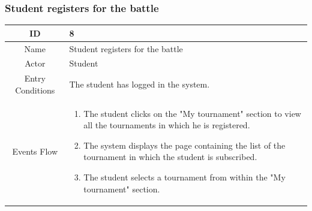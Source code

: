 \subsubsection{Student registers for the battle}
\begin{longtable}{|c| p{10cm}|}
        \hline
            ID & 8 \\
        \hline
            Name & Student registers for the battle  \\
        \hline
            Actor & Student \\
        \hline
            Entry Conditions & 
                                    The student  has logged in the system.
\\
        \hline
            Events Flow &   \begin{enumerate}
                
                                \item The student clicks on the "My tournament" section to view all the tournaments in which he is registered.
                                \item The system displays the page containing the list of the tournament in which the student is subscribed.
                                \item The student selects a tournament from within the "My tournament" section.


\end{enumerate}
\end{longtable}
